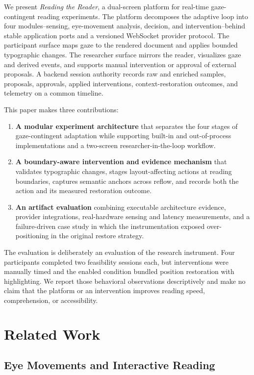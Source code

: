 \documentclass[sigconf,review,anonymous]{acmart}
\begin{document}
We present \emph{Reading the Reader}, a dual-screen platform for real-time gaze-contingent reading experiments.
The platform decomposes the adaptive loop into four modules--sensing, eye-movement analysis, decision, and intervention--behind stable application ports and a versioned WebSocket provider protocol.
The participant surface maps gaze to the rendered document and applies bounded typographic changes.
The researcher surface mirrors the reader, visualizes gaze and derived events, and supports manual intervention or approval of external proposals.
A backend session authority records raw and enriched samples, proposals, approvals, applied interventions, context-restoration outcomes, and telemetry on a common timeline.

This paper makes three contributions:

\begin{enumerate}
    \item \textbf{A modular experiment architecture} that separates the four stages of gaze-contingent adaptation while supporting built-in and out-of-process implementations and a two-screen researcher-in-the-loop workflow.
    \item \textbf{A boundary-aware intervention and evidence mechanism} that validates typographic changes, stages layout-affecting actions at reading boundaries, captures semantic anchors across reflow, and records both the action and its measured restoration outcome.
    \item \textbf{An artifact evaluation} combining executable architecture evidence, provider integrations, real-hardware sensing and latency measurements, and a failure-driven case study in which the instrumentation exposed over-positioning in the original restore strategy.
\end{enumerate}

The evaluation is deliberately an evaluation of the research instrument.
Four participants completed two feasibility sessions each, but interventions were manually timed and the enabled condition bundled position restoration with highlighting.
We report those behavioral observations descriptively and make no claim that the platform or an intervention improves reading speed, comprehension, or accessibility.

\section{Related Work}

\subsection{Eye Movements and Interactive Reading}
\end{document}
